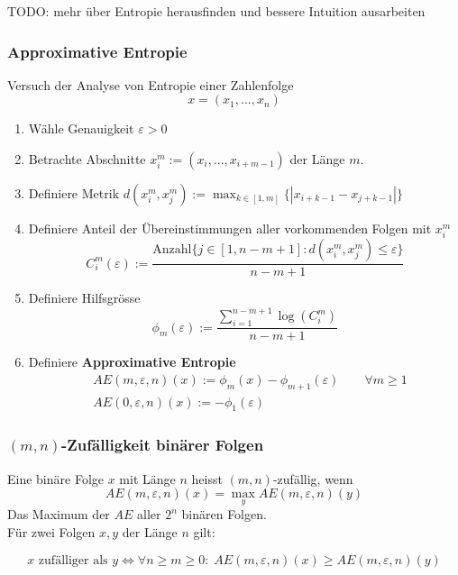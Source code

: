 \documentclass[a4paper]{article}
\begin{document}
TODO: mehr über Entropie herausfinden und bessere Intuition ausarbeiten

\subsubsection{Approximative Entropie}
Versuch der Analyse von Entropie einer Zahlenfolge
\[
x = \left(
	x_1, ..., x_{n}
\right) 
\] 

\begin{enumerate}
	\item Wähle Genauigkeit $\varepsilon > 0$
	\item Betrachte Abschnitte $x_{i} ^{m} := (x_{i}, ..., x_{i+m-1})$
		der Länge $m$.
	\item Definiere Metrik 
		$d(x_{i} ^{m}, x_{j} ^{m}) := \max_{k\in [1, m]} \{
			| x_{i+k-1} - x_{j+k-1} |
		\} $
	\item Definiere Anteil der Übereinstimmungen 
		aller vorkommenden Folgen
		mit $x_{i} ^{m}$
		\[
			C_{i} ^{m} (\varepsilon)
			:= \frac{ 
				\text{Anzahl} \{
					j \in [1, n-m+1]:
					d \left(
						x_{i} ^{m}, x_{j} ^{m}
					\right) \leq \varepsilon
				\} 
			}{ n - m + 1 }
		\]
	\item Definiere Hilfsgrösse
		\[
			\phi_m (\varepsilon)
			:=
			\frac{ \sum_{i=1}^{n-m+1} \log (C_i ^{m}) }{ n-m+1 }
		\] 
	\item Definiere \textbf{Approximative Entropie}
		\begin{align*}
			& AE (m, \varepsilon, n) (x) := 
			\phi_m (x) - \phi_{m+1} (\varepsilon)
			\qquad \forall m \geq 1
			\\
			& AE(0, \varepsilon, n) (x) :=
			- \phi_1 (\varepsilon)
		\end{align*}
\end{enumerate}

\subsubsection*{$(m,n)$-Zufälligkeit binärer Folgen}
Eine binäre Folge $x$ mit Länge $n$ heisst $(m,n)$-zufällig, wenn
\[
	AE(m, \varepsilon, n) (x) = \max_{y} AE(m, \varepsilon, n)(y)
\] 
Das Maximum der $AE$ aller $2^{n}$ binären Folgen.
\\

Für zwei Folgen $x, y$ der Länge $n$ gilt:

\[
x \text{ zufälliger als } y 
\Leftrightarrow
\forall n \geq m \geq 0: \;
AE(m, \varepsilon, n) (x) \geq
AE(m, \varepsilon, n) (y)
\] 
\end{document}
